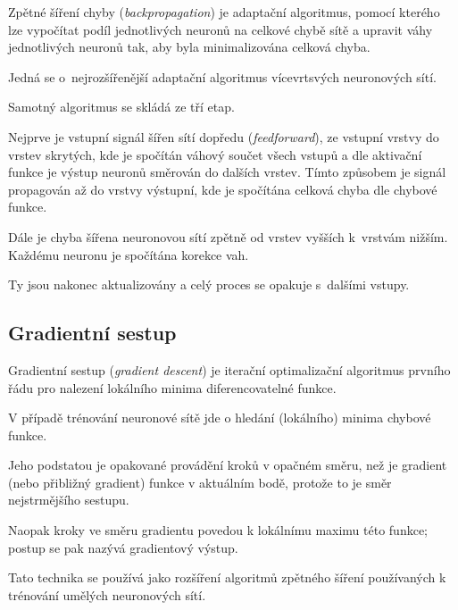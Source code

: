 \begin{compactitem}
    \item Zpětné šíření chyby (\textit{backpropagation}) je adaptační algoritmus, pomocí kterého lze vypočítat podíl jednotlivých neuronů na celkové chybě sítě a upravit váhy jednotlivých neuronů tak, aby byla minimalizována celková chyba.

    \item Jedná se o~nejrozšířenější adaptační algoritmus vícevrtsvých neuronových sítí.

    \item Samotný algoritmus se skládá ze tří etap. \begin{compactitem}
        \item Nejprve je vstupní signál šířen sítí dopředu (\textit{feedforward}), ze vstupní vrstvy do vrstev skrytých, kde je spočítán váhový součet všech vstupů a dle aktivační funkce je výstup neuronů směrován do dalších vrstev. Tímto způsobem je signál propagován až do vrstvy výstupní, kde je spočítána celková chyba dle chybové funkce.

        \item Dále je chyba šířena neuronovou sítí zpětně od vrstev vyšších k~vrstvám nižším. Každému neuronu je spočítána korekce vah.

        \item Ty jsou nakonec aktualizovány a celý proces se opakuje s~dalšími vstupy.
    \end{compactitem}
\end{compactitem}

\subsection{Gradientní sestup}

\begin{compactitem}
    \item Gradientní sestup (\textit{gradient descent}) je iterační optimalizační algoritmus prvního řádu pro nalezení lokálního minima diferencovatelné funkce. \begin{compactitem}
        \item V případě trénování neuronové sítě jde o hledání (lokálního) minima chybové funkce.
    \end{compactitem}

    \item Jeho podstatou je opakované provádění kroků v opačném směru, než je gradient (nebo přibližný gradient) funkce v aktuálním bodě, protože to je směr nejstrmějšího sestupu. \begin{compactitem}
        \item Naopak kroky ve směru gradientu povedou k lokálnímu maximu této funkce; postup se pak nazývá gradientový výstup.
    \end{compactitem}

    \item Tato technika se používá jako rozšíření algoritmů zpětného šíření používaných k trénování umělých neuronových sítí.
\end{compactitem}

